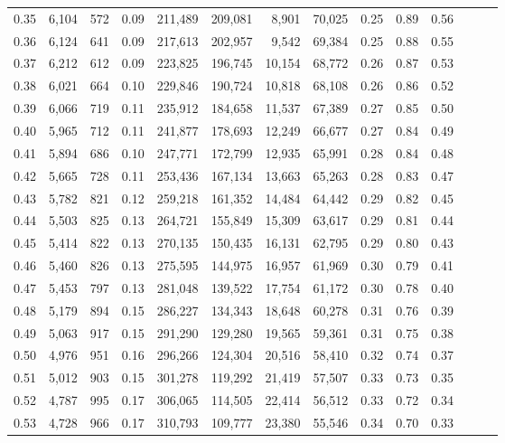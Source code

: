 \begin{tabular}{rrrrrrrrrrrrrr}
0.35 &  6,104 &    572 &  0.09 &  211,489 &  209,081 &   8,901 &  70,025 &  0.25 &  0.89 &      0.56 \\
0.36 &  6,124 &    641 &  0.09 &  217,613 &  202,957 &   9,542 &  69,384 &  0.25 &  0.88 &      0.55 \\
0.37 &  6,212 &    612 &  0.09 &  223,825 &  196,745 &  10,154 &  68,772 &  0.26 &  0.87 &      0.53 \\
0.38 &  6,021 &    664 &  0.10 &  229,846 &  190,724 &  10,818 &  68,108 &  0.26 &  0.86 &      0.52 \\
0.39 &  6,066 &    719 &  0.11 &  235,912 &  184,658 &  11,537 &  67,389 &  0.27 &  0.85 &      0.50 \\
0.40 &  5,965 &    712 &  0.11 &  241,877 &  178,693 &  12,249 &  66,677 &  0.27 &  0.84 &      0.49 \\
0.41 &  5,894 &    686 &  0.10 &  247,771 &  172,799 &  12,935 &  65,991 &  0.28 &  0.84 &      0.48 \\
0.42 &  5,665 &    728 &  0.11 &  253,436 &  167,134 &  13,663 &  65,263 &  0.28 &  0.83 &      0.47 \\
0.43 &  5,782 &    821 &  0.12 &  259,218 &  161,352 &  14,484 &  64,442 &  0.29 &  0.82 &      0.45 \\
0.44 &  5,503 &    825 &  0.13 &  264,721 &  155,849 &  15,309 &  63,617 &  0.29 &  0.81 &      0.44 \\
0.45 &  5,414 &    822 &  0.13 &  270,135 &  150,435 &  16,131 &  62,795 &  0.29 &  0.80 &      0.43 \\
0.46 &  5,460 &    826 &  0.13 &  275,595 &  144,975 &  16,957 &  61,969 &  0.30 &  0.79 &      0.41 \\
0.47 &  5,453 &    797 &  0.13 &  281,048 &  139,522 &  17,754 &  61,172 &  0.30 &  0.78 &      0.40 \\
0.48 &  5,179 &    894 &  0.15 &  286,227 &  134,343 &  18,648 &  60,278 &  0.31 &  0.76 &      0.39 \\
0.49 &  5,063 &    917 &  0.15 &  291,290 &  129,280 &  19,565 &  59,361 &  0.31 &  0.75 &      0.38 \\
0.50 &  4,976 &    951 &  0.16 &  296,266 &  124,304 &  20,516 &  58,410 &  0.32 &  0.74 &      0.37 \\
0.51 &  5,012 &    903 &  0.15 &  301,278 &  119,292 &  21,419 &  57,507 &  0.33 &  0.73 &      0.35 \\
0.52 &  4,787 &    995 &  0.17 &  306,065 &  114,505 &  22,414 &  56,512 &  0.33 &  0.72 &      0.34 \\
0.53 &  4,728 &    966 &  0.17 &  310,793 &  109,777 &  23,380 &  55,546 &  0.34 &  0.70 &      0.33 \\

\end{tabular}
